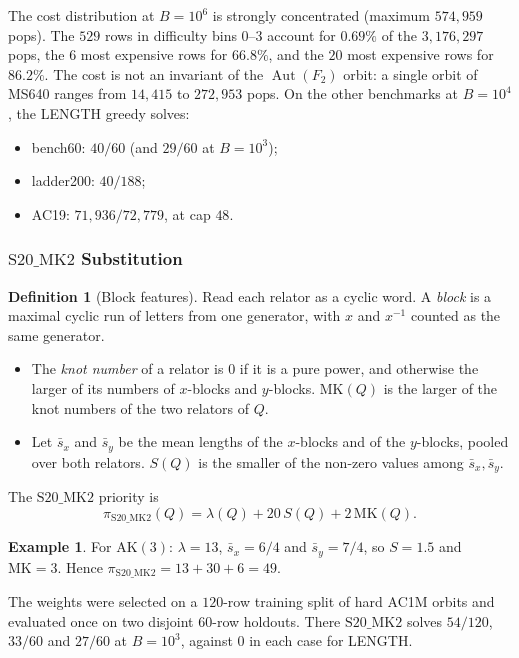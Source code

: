 \documentclass[11pt]{article}
\theoremstyle{definition}
\newtheorem{definition}[theorem]{Definition}
\newtheorem{example}[theorem]{Example}
\theoremstyle{remark}
\newcommand{\F}{F}
\newcommand{\Aut}{\operatorname{Aut}}
\newcommand{\SMK}{\mathrm{S20\_MK2}}
\begin{document}
The cost distribution at $B=10^6$ is strongly concentrated (maximum $574{,}959$ pops). The $529$ rows in difficulty bins $0$--$3$ account for
$0.69\%$ of the $3{,}176{,}297$ pops, the $6$ most expensive rows for $66.8\%$, and the $20$ most expensive rows for
$86.2\%$. The cost is not an invariant of the $\Aut(\F_2)$ orbit: a single orbit of MS640 ranges from $14{,}415$ to
$272{,}953$ pops. On the other benchmarks at $B=10^4$, the LENGTH greedy solves:
\begin{itemize}
  \item bench60: $40/60$ (and $29/60$ at $B=10^3$);
  \item ladder200: $40/188$;
  \item AC19: $71{,}936/72{,}779$, at cap $48$.
\end{itemize}

\subsubsection{\texorpdfstring{$\SMK$}{S20\_MK2} Substitution}

\begin{definition}[Block features]
Read each relator as a cyclic word. A \emph{block} is a maximal cyclic run of letters from one generator, with $x$ and
$x^{-1}$ counted as the same generator.
\begin{itemize}
  \item The \emph{knot number} of a relator is $0$ if it is a pure power, and otherwise the larger of its numbers of
  $x$-blocks and $y$-blocks. $\mathrm{MK}(Q)$ is the larger of the knot numbers of the two relators of $Q$.
  \item Let $\bar s_x$ and $\bar s_y$ be the mean lengths of the $x$-blocks and of the $y$-blocks, pooled over both
  relators. $S(Q)$ is the smaller of the non-zero values among $\bar s_x,\bar s_y$.
\end{itemize}
The $\SMK$ priority is
\[
\pi_{\SMK}(Q)=\lambda(Q)+20\,S(Q)+2\,\mathrm{MK}(Q).
\]
\end{definition}

\begin{example}
For $\mathrm{AK}(3)$: $\lambda=13$, $\bar s_x=6/4$ and $\bar s_y=7/4$, so $S=1.5$ and $\mathrm{MK}=3$. Hence
$\pi_{\SMK}=13+30+6=49$.
\end{example}

The weights were selected on a $120$-row training split of hard AC1M orbits and evaluated once on two disjoint
$60$-row holdouts. There $\SMK$ solves $54/120$, $33/60$ and $27/60$ at $B=10^3$, against $0$ in each case for LENGTH.
\end{document}
